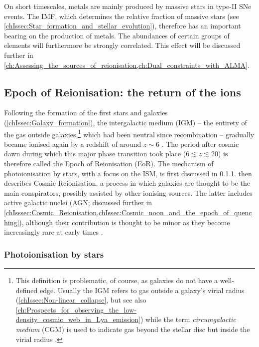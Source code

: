On short timescales, metals are mainly produced by massive stars in type-II SNe events. The IMF, which determines the relative fraction of massive stars (see \cref{chIssec:Star_formation_and_stellar_evolution}), therefore has an important bearing on the production of metals. The abundances of certain groups of elements will furthermore be strongly correlated. This effect will be discussed further in \cref{ch:Assessing_the_sources_of_reionisation,ch:Dual_constraints_with_ALMA}.

\subsection{Epoch of Reionisation: the return of the ions}
\label{chIssec:Epoch_of_Reionisation}

Following the formation of the first stars and galaxies (\cref{chIssec:Galaxy_formation}), the intergalactic medium (IGM) -- the entirety of the gas outside galaxies,\footnote{This definition is problematic, of course, as galaxies do not have a well-defined edge. Usually the IGM refers to gas outside a galaxy's virial radius (\cref{chIssec:Non-linear_collapse}, but see also \cref{ch:Prospects_for_observing_the_low-density_cosmic_web_in_Lya_emission}) while the term \textit{circumgalactic medium} (CGM) is used to indicate gas beyond the stellar disc but inside the virial radius \citep*{2017ARA&A..55..389T}.} which had been neutral since recombination -- gradually became ionised again by a redshift of around $z \sim 6$ \citep{2022ARA&A..60..121R}. The period after cosmic dawn during which this major phase transition took place ($6 \lesssim z \lesssim 20$) is therefore called the Epoch of Reionisation (EoR). The mechanism of photoionisation by stars, with a focus on the ISM, is first discussed in \cref{chIsssec:Photoionisation_by_stars}.  then describes Cosmic Reionisation, a process in which galaxies are thought to be the main conspirators, possibly assisted by other ionising sources. The latter includes active galactic nuclei (AGN; discussed further in \cref{chIsssec:Cosmic_Reionisation,chIssec:Cosmic_noon_and_the_epoch_of_quenching}), although their contribution is thought to be minor \citep{2022ARA&A..60..121R} as they become increasingly rare at early times \citep{2019MNRAS.488.1035K}.

\subsubsection{Photoionisation by stars}
\label{chIsssec:Photoionisation_by_stars}

